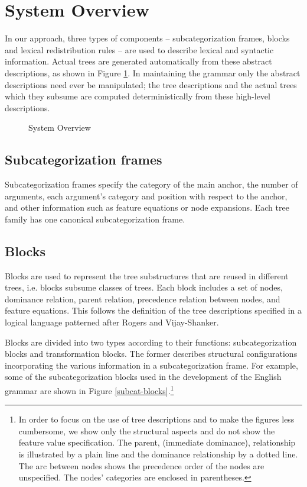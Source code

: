 \section{System Overview}

In our approach,  
three types of components -- subcategorization frames, blocks and
lexical redistribution rules -- are used to describe lexical and
syntactic information.
Actual trees are generated automatically from these abstract descriptions,
as shown in Figure \ref{system-overview}.
In maintaining the grammar only the abstract
descriptions need ever be manipulated; the tree descriptions and the
actual trees which they subsume are computed deterministically from these
high-level descriptions. 


\begin{figure}[htb]
\centerline{}
\caption{System Overview}
\label{system-overview}
\end{figure}

\subsection{Subcategorization frames}
Subcategorization frames specify
the category of the main anchor, 
the number of  arguments,
each argument's category and position with respect to the anchor,
and other information
such as feature equations or node expansions.
Each tree family has one canonical subcategorization frame.

\subsection{Blocks}

Blocks are used to represent the tree substructures that are reused
in different trees, i.e. blocks 
subsume classes of trees. Each block includes
a set of nodes, dominance relation, parent relation, 
precedence relation between nodes,
and feature equations. This follows the definition of the tree 
descriptions specified in a logical language patterned after Rogers and
Vijay-Shanker\cite{rogers-vijay94}. 

Blocks are divided into two types according to their functions: 
subcategorization  blocks
and transformation blocks. 
The former describes structural configurations incorporating
the various information in a subcategorization frame. 
For example, some of the subcategorization blocks
used in the
development of the English grammar are shown in Figure 
\ref{subcat-blocks}.\footnote{
In order to focus on the use of tree descriptions and to 
make the figures less cumbersome, we show only
the structural aspects and do not show the feature value specification.
The parent, (immediate dominance), relationship is illustrated by
a plain line and the dominance relationship by a dotted line.
The arc between nodes shows the precedence order of
the nodes are unspecified. The nodes' categories
are enclosed in parentheses.}

